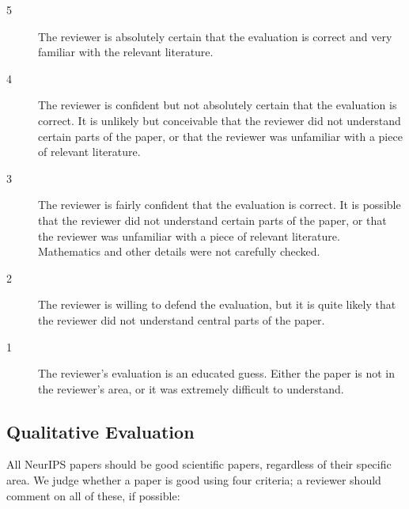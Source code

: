 \begin{description}
\item[5] The reviewer is absolutely certain that the evaluation is correct and
very familiar with the relevant literature.

\item[4] The reviewer is confident but not absolutely certain that the
evaluation is correct. It is unlikely but conceivable that the reviewer
did not understand certain parts of the paper, or that the reviewer was
unfamiliar with a piece of relevant literature.

\item[3] The reviewer is fairly confident that the evaluation is correct. It
is possible that the reviewer did not understand certain parts of the
paper, or that the reviewer was unfamiliar with a piece of relevant
literature. Mathematics and other details were not carefully checked.

\item[2] The reviewer is willing to defend the evaluation, but it is quite
likely that the reviewer did not understand central parts of the paper.

\item[1] The reviewer's evaluation is an educated guess. Either the paper is
not in the reviewer's area, or it was extremely difficult to understand.
\end{description}

\subsection*{Qualitative Evaluation}\label{qualitative-evaluation}

All NeurIPS papers should be good scientific papers, regardless of their
specific area. We judge whether a paper is good using four criteria; a
reviewer should comment on all of these, if possible:

